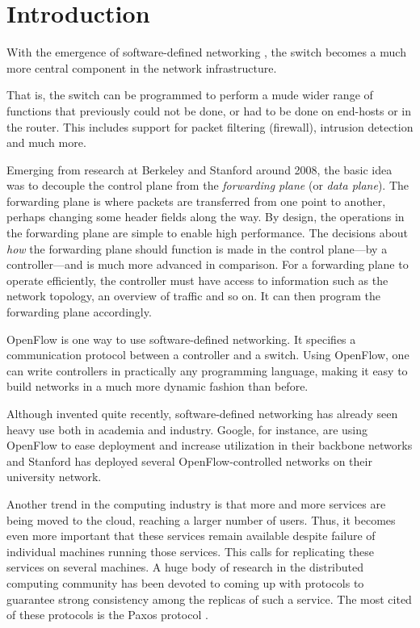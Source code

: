 \chapter{Introduction}
\label{chapter:introduction}

With the emergence of software-defined networking
\cite{Casado:2005:VNS:1047344.1047383}, the switch becomes a much
more central component in the network infrastructure.

That is, the switch can be programmed to perform a mude wider range of
functions that previously could not be done, or had to be done on end-hosts
or in the router.
%
This includes support for packet filtering (firewall), intrusion detection
and much more.

Emerging from research at Berkeley and
Stanford around 2008, the basic idea was to decouple the
control plane from the \textit{forwarding plane} (or
\textit{data plane}).
%
The forwarding plane is where packets are transferred from one point to
another, perhaps changing some header fields along the way.
%
By design, the operations in the forwarding plane are simple to enable high
performance.
%
The decisions about \textit{how} the forwarding plane should function is
made in the control plane---by a controller---and is much more advanced in
comparison.
%
For a forwarding plane to operate efficiently, the controller must have
access to information such as the network topology, an overview of traffic
and so on.  It can then program the forwarding plane accordingly.

OpenFlow \cite{openflow-1.0} is one way to use software-defined
networking.  It specifies a communication protocol between a controller and
a switch.
Using OpenFlow, one can write controllers in practically any programming
language, making it easy to build networks in a much more dynamic fashion
than before.

Although invented quite recently, software-defined networking has already
seen heavy use both in academia and industry.
%
Google, for instance, are
using OpenFlow to ease deployment and increase utilization in their backbone
networks \cite{crabbe2012sdn} and Stanford has deployed several
OpenFlow-controlled networks on their university network.

Another trend in the computing industry is that more and more services are
being moved to the cloud, reaching a larger number of users.
%
Thus, it becomes even more important that these services remain available
despite failure of individual machines running those services.
%
This calls for replicating these services on several machines.
%
A huge body of research in the distributed computing community has been
devoted to coming up with protocols to guarantee strong consistency among
the replicas of such a service.
%
The most cited of these protocols is the Paxos protocol
\cite{Lam01,Lamport:1998:PP:279227.279229}.

